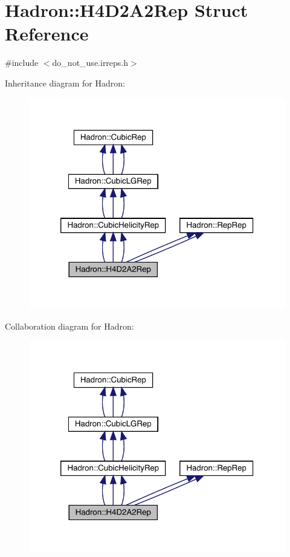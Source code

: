 \hypertarget{structHadron_1_1H4D2A2Rep}{}\section{Hadron\+:\+:H4\+D2\+A2\+Rep Struct Reference}
\label{structHadron_1_1H4D2A2Rep}


{\ttfamily \#include $<$do\+\_\+not\+\_\+use.\+irreps.\+h$>$}



Inheritance diagram for Hadron\+:
\nopagebreak
\begin{figure}[H]
\begin{center}
\leavevmode
\includegraphics[width=320pt]{d8/dd6/structHadron_1_1H4D2A2Rep__inherit__graph}
\end{center}
\end{figure}


Collaboration diagram for Hadron\+:
\nopagebreak
\begin{figure}[H]
\begin{center}
\leavevmode
\includegraphics[width=320pt]{de/d69/structHadron_1_1H4D2A2Rep__coll__graph}
\end{center}
\end{figure}
